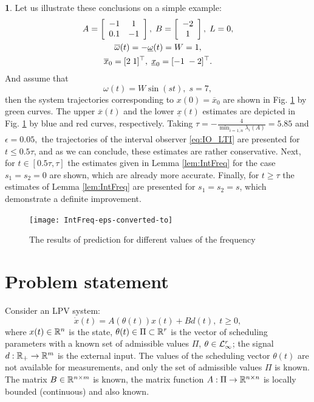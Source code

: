 \documentclass[twocolumn,english]{IEEEtran}
\theoremstyle{plain}
\theoremstyle{definition}
\newtheorem*{example*}{\protect\examplename}
\theoremstyle{plain}
\theoremstyle{plain}
\theoremstyle{remark}
\providecommand{\examplename}{Example}
\begin{document}
\begin{example*}
Let us illustrate these conclusions on a simple example:
\begin{gather*}
A=\left[\begin{array}{cc}
-1 & 1\\
0.1 & -1
\end{array}\right],\;B=\left[\begin{array}{c}
-2\\
1
\end{array}\right],\;L=0,\\
\overline{\omega}(t)=-\underline{\omega}(t)=W=1,\\
\overline{x}_{0}=[2\;1]^{\top},\;\underline{x}_{0}=[-1\;-2]^{\top}.
\end{gather*}
And assume that
\[
\omega(t)=W\sin(st),\;s=7,
\]
then the system trajectories corresponding to $x(0)=\overline{x}_{0}$ are shown in Fig. \ref{fig:IntFreq} by green curves. The upper $\overline{x}(t)$ and the lower $\underline{x}(t)$ estimates are depicted in Fig. \ref{fig:IntFreq} by blue and red curves, respectively. Taking $\tau=-\frac{4}{\min_{i=\overline{1,n}}\lambda_{i}(A)}=5.85$ and $\epsilon=0.05,$ the trajectories of the interval observer \eqref{eq:IO_LTI} are presented for $t\leq0.5\tau$, and as we can conclude, these estimates are rather conservative. Next, for $t\in[0.5\tau,\tau]$ the estimates given in Lemma \ref{lem:IntFreq} for the case $s_{1}=s_{2}=0$ are shown, which are already more accurate. Finally, for $t\geq\tau$ the estimates of Lemma \ref{lem:IntFreq} are presented for $s_{1}=s_{2}=s$, which demonstrate a definite improvement. 
\begin{figure}
\begin{centering}
\texttt{[image: IntFreq-eps-converted-to]}
\par\end{centering}
\caption{\label{fig:IntFreq} The results of prediction for different values
of the frequency}
\end{figure}
\end{example*}

\section{\label{sec:Problem-statement} Problem statement}

Consider an LPV system:
\begin{equation}
\dot{x}(t)=A(\theta(t))x(t)+Bd(t),\;t\geq0,\label{eq:LPV_syst}
\end{equation}
where $x(t)\in\mathbb{R}^{n}$ is the state, $\theta(t)\in\Pi\subset\mathbb{R}^{r}$ is the vector of scheduling parameters with a known set of admissible values $\Pi$, $\theta\in\mathcal{L}_{\infty}^{r}$; the signal $d:\mathbb{R}_{+}\to\mathbb{R}^{m}$ is the external input. The values of the scheduling vector $\theta(t)$ are not available for measurements, and only the set of admissible values $\Pi$ is known. The matrix $B\in\mathbb{R}^{n\times m}$ is known, the matrix function $A:\Pi\to\mathbb{R}^{n\times n}$ is locally bounded (continuous) and also known.
\end{document}

